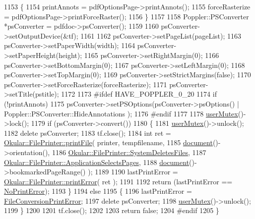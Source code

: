 \begin{DoxyCode}
1153     \{
1154         printAnnots = pdfOptionsPage->printAnnots();
1155         forceRasterize = pdfOptionsPage->printForceRaster();
1156     \}
1157 
1158     Poppler::PSConverter *psConverter = pdfdoc->psConverter();
1159 
1160     psConverter->setOutputDevice(&tf);
1161 
1162     psConverter->setPageList(pageList);
1163     psConverter->setPaperWidth(width);
1164     psConverter->setPaperHeight(height);
1165     psConverter->setRightMargin(0);
1166     psConverter->setBottomMargin(0);
1167     psConverter->setLeftMargin(0);
1168     psConverter->setTopMargin(0);
1169     psConverter->setStrictMargins(\textcolor{keyword}{false});
1170     psConverter->setForceRasterize(forceRasterize);
1171     psConverter->setTitle(pstitle);
1172 
1173 \textcolor{preprocessor}{#ifdef HAVE\_POPPLER\_0\_20}
1174     \textcolor{keywordflow}{if} (!printAnnots)
1175         psConverter->setPSOptions(psConverter->psOptions() | Poppler::PSConverter::HideAnnotations );
1176 \textcolor{preprocessor}{#endif}
1177 
1178     \hyperlink{classOkular_1_1Generator_a83d702cccbce2288c3258d97f1f15e19}{userMutex}()->lock();
1179     \textcolor{keywordflow}{if} (psConverter->convert())
1180     \{
1181         \hyperlink{classOkular_1_1Generator_a83d702cccbce2288c3258d97f1f15e19}{userMutex}()->unlock();
1182         \textcolor{keyword}{delete} psConverter;
1183         tf.close();
1184         \textcolor{keywordtype}{int} ret = \hyperlink{classOkular_1_1FilePrinter_abd5ec189d80d15983c49f91f7e1d38c1}{Okular::FilePrinter::printFile}( printer, tempfilename,
1185                                                   \hyperlink{classOkular_1_1Generator_a4248672ef04e62660d51f16c0a862bbe}{document}()->orientation(),
1186                                                   
      \hyperlink{classOkular_1_1FilePrinter_acd01eb48e99f9289a7f4786a366ef7baa86d9b928c2434b89a15de26c8cc22705}{Okular::FilePrinter::SystemDeletesFiles},
1187                                                   
      \hyperlink{classOkular_1_1FilePrinter_a755b647910344031db1d79312482981da3910c7efe4c8f4f8a69459765bea25a4}{Okular::FilePrinter::ApplicationSelectsPages},
1188                                                   \hyperlink{classOkular_1_1Generator_a4248672ef04e62660d51f16c0a862bbe}{document}()->bookmarkedPageRange() );
1189 
1190         lastPrintError = \hyperlink{classOkular_1_1FilePrinter_aee2cfc9da47e38eb986a7f42dd774b41}{Okular::FilePrinter::printError}( ret );
1191 
1192         \textcolor{keywordflow}{return} (lastPrintError == \hyperlink{classOkular_1_1Generator_a43266d4eb3e7929924dd10ea53bc1d61a6186f0488397997c9a950b5e5c1b472d}{NoPrintError});
1193     \}
1194     \textcolor{keywordflow}{else}
1195     \{
1196         lastPrintError = \hyperlink{classOkular_1_1Generator_a43266d4eb3e7929924dd10ea53bc1d61aec9027f4e5cfdae52f83de14e52dde41}{FileConversionPrintError};
1197         \textcolor{keyword}{delete} psConverter;
1198         \hyperlink{classOkular_1_1Generator_a83d702cccbce2288c3258d97f1f15e19}{userMutex}()->unlock();
1199     \}
1200 
1201     tf.close();
1202 
1203     \textcolor{keywordflow}{return} \textcolor{keyword}{false};
1204 \textcolor{preprocessor}{#endif}
1205 \}
\end{DoxyCode}
